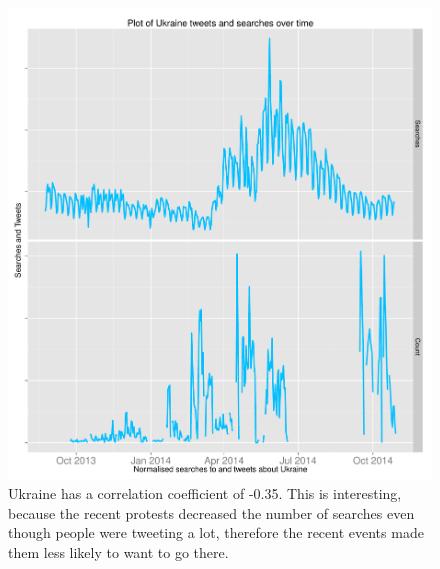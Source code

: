\documentclass[minf,twoside,singlespacing,parskip,frontabs,notimes,11pt]{infthesis}
\begin{document}
\begin{figure}[]
\includegraphics[scale=0.6]{Ukraine}
\caption{Ukraine has a correlation coefficient of -0.35. This is interesting, because the recent protests decreased the number of searches even though people were tweeting a lot, therefore the recent events made them less likely to want to go there. }
\end{figure}
\end{document}
